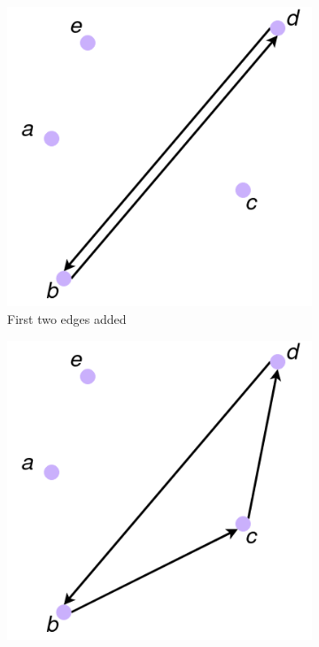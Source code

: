 \begin{figure}
\begin{subfigure}[b]{0.3\textwidth}
		\includegraphics[width=\textwidth]{images/extra_2}
		\caption{First two edges added}
	\end{subfigure}
	\hfill
	\begin{subfigure}[b]{0.3\textwidth}
		\includegraphics[width=\textwidth]{images/extra_3}

\end{subfigure}
\end{figure}
